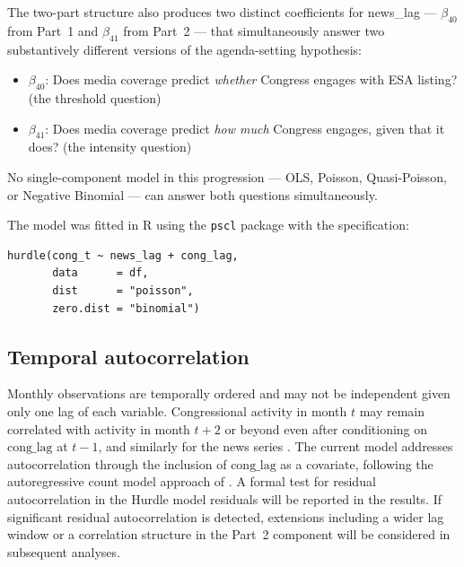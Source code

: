 \documentclass[11pt]{article}
\begin{document}
The two-part structure also produces two distinct coefficients for
news\_lag --- $\beta_{40}$ from Part~1 and $\beta_{41}$ from Part~2 ---
that simultaneously answer two substantively different versions of the
agenda-setting hypothesis:
 
\begin{itemize}[itemsep=2pt]
  \item $\beta_{40}$: Does media coverage predict \textit{whether}
    Congress engages with ESA listing? (the threshold question)
  \item $\beta_{41}$: Does media coverage predict \textit{how much}
    Congress engages, given that it does? (the intensity question)
\end{itemize}
 
No single-component model in this progression --- OLS, Poisson,
Quasi-Poisson, or Negative Binomial --- can answer both questions
simultaneously.
 
The model was fitted in R \citep{RCoreTeam} using the \texttt{pscl}
package \citep{Zeileis2008} with the specification:
 
\begin{verbatim}
hurdle(cong_t ~ news_lag + cong_lag,
       data      = df,
       dist      = "poisson",
       zero.dist = "binomial")
\end{verbatim}
 
\subsection{Temporal autocorrelation}
 
Monthly observations are temporally ordered and may not be
independent given only one lag of each variable. Congressional activity
in month $t$ may remain correlated with activity in month $t{+}2$ or
beyond even after conditioning on $\text{cong\_lag}$ at $t{-}1$, and
similarly for the news series \citep{Brandt2000}. The current model
addresses autocorrelation through the inclusion of $\text{cong\_lag}$
as a covariate, following the autoregressive count model approach of
\citet{Brandt2000}. A formal test for residual autocorrelation in the
Hurdle model residuals will be reported in the results. If significant
residual autocorrelation is detected, extensions including a wider lag
window or a correlation structure in the Part~2 component will be
considered in subsequent analyses.
 
\end{document}
